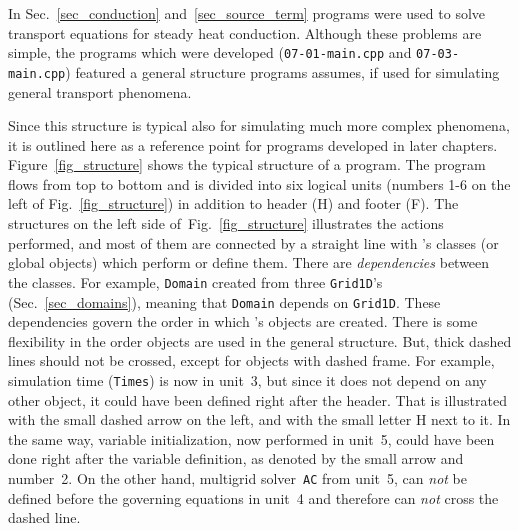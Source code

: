 \label{chap_structure}

In Sec.~\ref{sec_conduction} and~\ref{sec_source_term} {\psiboil} programs
were used to solve transport equations for steady heat conduction. 
%
Although these problems are simple, the programs which were
developed ({\tt 07-01-main.cpp} and {\tt 07-03-main.cpp}) featured
a general structure {\psiboil} programs assumes, if used for
simulating general transport phenomena. 

Since this structure is typical also for simulating much more complex 
phenomena, it is outlined here as a reference point for programs
developed in later chapters. 
%
Figure~\ref{fig_structure} shows the typical structure of a {\psiboil}
program. The program flows from top to bottom and is divided into six
logical units (numbers 1-6 on the left of Fig.~\ref{fig_structure}) in
addition to header (H) and footer (F). The structures on the left
side of~Fig.~\ref{fig_structure} illustrates the actions performed, and
most of them are connected by a straight line with {\psiboil}'s classes 
(or global objects) which perform or define them. There are 
{\em dependencies} between the classes. For example, {\tt Domain}
created from three {\tt Grid1D}'s (Sec.~\ref{sec_domains}), meaning
that {\tt Domain} depends on {\tt Grid1D}. These dependencies govern
the order in which {\psiboil}'s objects are created. There is some
flexibility in the order objects are used in the general structure.
But, thick dashed lines should not be crossed, except for objects
with dashed frame. For example, simulation time ({\tt Times}) is now
in unit~3, but since it does not depend on any other object, it could
have been defined right after the header. That is illustrated with the
small dashed arrow on the left, and with the small letter H next to it.
In the same way, variable initialization, now performed in unit~5, 
could have been done right after the variable definition, as denoted
by the small arrow and number~2. On the other hand, multigrid solver~{\tt AC}
from unit~5, can {\em not} be defined before the governing equations
in unit~4 and therefore can {\em not} cross the dashed line. 

